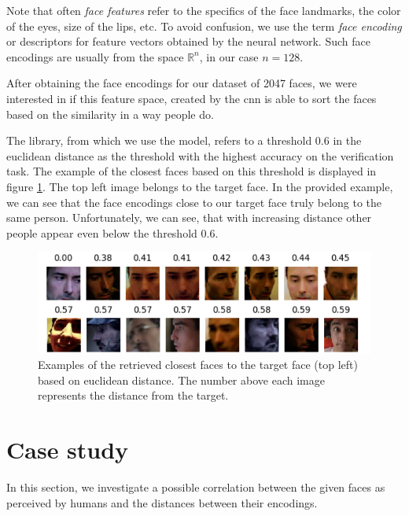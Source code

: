 Note that often \emph{face features} refer to the specifics of the face landmarks, the color of the eyes, size of the lips, etc. To avoid confusion, we use the term \emph{face encoding} or descriptors for feature vectors obtained by the neural network. Such face encodings are usually from the space $\mathbb{R}^n$, in our case $n=128$.

After obtaining the face encodings for our dataset of 2047 faces, we were interested in if this feature space, created by the \acrshort{cnn} is able to sort the faces based on the similarity in a way people do. 

The library, from which we use the model, refers to a threshold 0.6 in the euclidean distance as the threshold with the highest accuracy on the verification task. The example of the closest faces based on this threshold is displayed in figure \ref{fig:closest_faces}. The top left image belongs to the target face. In the provided example, we can see that the face encodings close to our target face truly belong to the same person. Unfortunately, we can see, that with increasing distance other people appear even below the threshold 0.6.


\begin{figure}
    \centering
    \includegraphics[width=\linewidth]{img/man_closest_faces.pdf}
    \caption[Examples of the retrieved closest faces to the target face based on euclidean distance]{Examples of the retrieved closest faces to the target face (top left) based on euclidean distance. The number above each image represents the distance from the target.}
    \label{fig:closest_faces}
\end{figure}

\section{Case study}
\label{s:case_study}


In this section, we investigate a possible correlation between the given faces as perceived by humans and the distances between their encodings.

